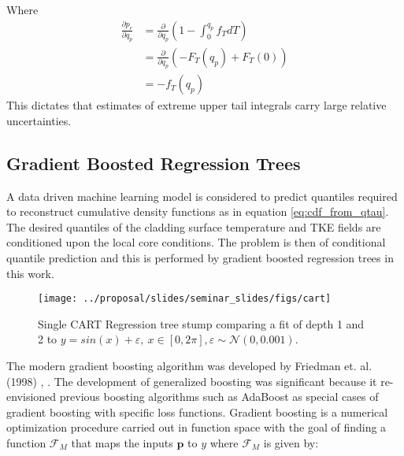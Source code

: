     Where
   \begin{eqnarray}
    \frac{\partial p_e}{\partial q_p} &= \frac{\partial}{\partial q_p} \left( 1 - \int_0^{q_p} f_T dT \right) \nonumber \\
    &= \frac{\partial}{\partial q_p} \left( -F_T(q_p) + F_T(0) \right) \nonumber \\
    &= -f_T(q_p)
    \end{eqnarray}
    This dictates that estimates of extreme upper tail integrals carry large relative uncertainties.
    


\subsection{Gradient Boosted Regression Trees}
\label{chap:GBRT}

A data driven machine learning model is considered to predict quantiles required to reconstruct cumulative density functions as in equation \ref{eq:cdf_from_qtau}.  The desired quantiles of the cladding surface temperature and TKE fields are conditioned upon the local core conditions.  The problem is then of conditional quantile prediction and this is performed by gradient boosted regression trees in this work.

\begin{figure}[H]
    \centering
    \texttt{[image: ../proposal/slides/seminar\_slides/figs/cart]}
    \caption[Regression tree stump.]{Single CART Regression tree stump comparing a fit of depth 1 and 2 to $y=sin(x) + \varepsilon,\ x\in[0,2\pi], \varepsilon \sim \mathcal N(0,0.001)$.}
    \label{fig:cart}
\end{figure}

The modern gradient boosting algorithm was developed by Friedman et. al. (1998) \cite{friedman1998}, \cite{friedman2001}.  The development of generalized boosting was significant because it re-envisioned previous boosting algorithms such as AdaBoost as special cases of gradient boosting with specific loss functions.  Gradient boosting is a numerical optimization procedure carried out in function space with the goal of finding a function $\mathcal F_M$ that maps the inputs $\mathbf p$ to $y$ where $\mathcal F_M$ is given by:

